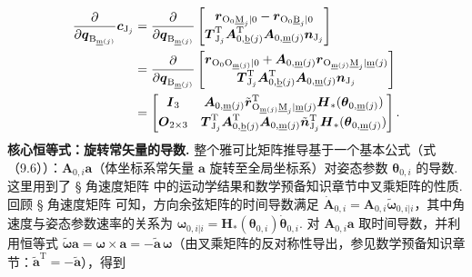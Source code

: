 \begin{align*}\frac{\partial}{\partial \boldsymbol{q}_{\text{B}_{\underline{\text{m}}(j)}}} \boldsymbol{c}_{\text{J}_j}
    &= \frac{\partial}{\partial \boldsymbol{q}_{\text{B}_{\underline{\text{m}}(j)}}} \begin{bmatrix} \boldsymbol{r}_{\text{O}_0\underline{\text{M}}_j|0} - \boldsymbol{r}_{\text{O}_0\underline{\text{B}}_j|0} \\ \boldsymbol{T}_{\text{J}_j}^\text{T} \boldsymbol{A}_{0,\underline{\text{b}}(j)}^\text{T} \boldsymbol{A}_{0,\underline{\text{m}}(j)} \boldsymbol{n}_{\text{J}_j} \end{bmatrix} \notag \\
    &= \frac{\partial}{\partial \boldsymbol{q}_{\text{B}_{\underline{\text{m}}(j)}}} \begin{bmatrix} \boldsymbol{r}_{\text{O}_0\text{O}_{\underline{\text{m}}(j)}|0} + \boldsymbol{A}_{0,\underline{\text{m}}(j)} \boldsymbol{r}_{\text{O}_{\underline{\text{m}}(j)}\underline{\text{M}}_j|\underline{\text{m}}(j)} \\ \boldsymbol{T}_{\text{J}_j}^\text{T} \boldsymbol{A}_{0,\underline{\text{b}}(j)}^\text{T} \boldsymbol{A}_{0,\underline{\text{m}}(j)} \boldsymbol{n}_{\text{J}_j} \end{bmatrix} \notag \\
    &= \begin{bmatrix} \boldsymbol{I}_3 & \boldsymbol{A}_{0,\underline{\text{m}}(j)} \tilde{\boldsymbol{r}}_{\text{O}_{\underline{\text{m}}(j)}\underline{\text{M}}_j|\underline{\text{m}}(j)}^\text{T} \boldsymbol{H}_*(\boldsymbol{\theta}_{0,\underline{\text{m}}(j)}) \\ \boldsymbol{O}_{2\times 3} & \boldsymbol{T}_{\text{J}_j}^\text{T} \boldsymbol{A}_{0,\underline{\text{b}}(j)}^\text{T} \boldsymbol{A}_{0,\underline{\text{m}}(j)} \tilde{\boldsymbol{n}}_{\text{J}_j}^\text{T} \boldsymbol{H}_*(\boldsymbol{\theta}_{0,\underline{\text{m}}(j)}) \end{bmatrix}.\end{align*}
\textbf{核心恒等式：旋转常矢量的导数.} 整个雅可比矩阵推导基于一个基本公式（式 （9.6））：$\boldsymbol{A}_{0,i}\boldsymbol{a}$（体坐标系常矢量 $\boldsymbol{a}$ 旋转至全局坐标系）对姿态参数 $\boldsymbol{\theta}_{0,i}$ 的导数. 这里用到了 § 角速度矩阵 中的运动学结果和数学预备知识章节中叉乘矩阵的性质.
回顾 § 角速度矩阵 可知，方向余弦矩阵的时间导数满足 $\dot{\boldsymbol{A}}_{0,i} = \boldsymbol{A}_{0,i}\tilde{\boldsymbol{\omega}}_{0,i|i}$，其中角速度与姿态参数速率的关系为 $\boldsymbol{\omega}_{0,i|i} = \boldsymbol{H}_*(\boldsymbol{\theta}_{0,i})\dot{\boldsymbol{\theta}}_{0,i}$. 对 $\boldsymbol{A}_{0,i}\boldsymbol{a}$ 取时间导数，并利用恒等式 $\tilde{\boldsymbol{\omega}}\boldsymbol{a} = \boldsymbol{\omega}\times\boldsymbol{a} = -\tilde{\boldsymbol{a}}\,\boldsymbol{\omega}$（由叉乘矩阵的反对称性导出，参见数学预备知识章节：$\tilde{\boldsymbol{a}}^\text{T} = -\tilde{\boldsymbol{a}}$），得到
